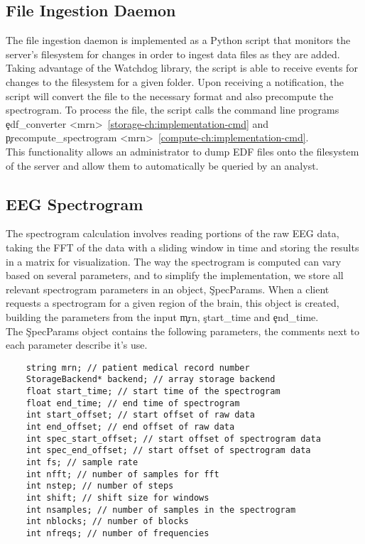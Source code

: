 \subsection{File Ingestion Daemon}

The file ingestion daemon is implemented as a Python script that monitors the
server's filesystem for changes in order to ingest data files as they are
added. Taking advantage of the Watchdog \cite{watchdog} library, the script is
able to receive events for changes to the filesystem for a given folder. Upon
receiving a notification, the script will convert the file to the necessary
format and also precompute the spectrogram. To process the file, the script
calls the command line programs \c{edf\_converter
  <mrn>}~\ref{storage-ch:implementation-cmd} and \c{precompute\_spectrogram
  <mrn>}~\ref{compute-ch:implementation-cmd}. \\

This functionality allows an administrator to dump EDF files onto the
filesystem of the server and allow them to automatically be queried by an
analyst.

\subsection{EEG Spectrogram}\label{compute-ch:implementation-spectrogram}

The spectrogram calculation involves reading portions of the raw EEG data,
taking the FFT of the data with a sliding window in time and storing the
results in a matrix for visualization. The way the spectrogram is computed can
vary based on several parameters, and to simplify the implementation, we store
all relevant spectrogram parameters in an object, \c{SpecParams}. When a client
requests a spectrogram for a given region of the brain, this object is created,
building the parameters from the input \c{mrn}, \c{start\_time} and
\c{end\_time}. \\

The \c{SpecParams} object contains the following parameters, the comments next
to each parameter describe it's use.

\begin{lstlisting}
    string mrn; // patient medical record number
    StorageBackend* backend; // array storage backend
    float start_time; // start time of the spectrogram
    float end_time; // end time of spectrogram
    int start_offset; // start offset of raw data
    int end_offset; // end offset of raw data
    int spec_start_offset; // start offset of spectrogram data
    int spec_end_offset; // start offset of spectrogram data
    int fs; // sample rate
    int nfft; // number of samples for fft
    int nstep; // number of steps
    int shift; // shift size for windows
    int nsamples; // number of samples in the spectrogram
    int nblocks; // number of blocks
    int nfreqs; // number of frequencies
\end{lstlisting}


